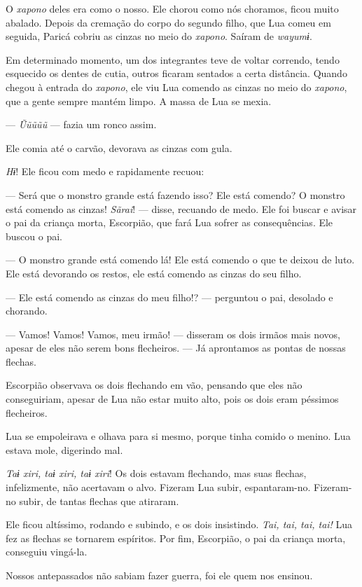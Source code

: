 O \textit{xapono} deles era como o nosso. Ele chorou como nós choramos, ficou
muito abalado. Depois da cremação do corpo do segundo filho, que Lua
comeu em seguida, Paricá cobriu as cinzas no meio do \textit{xapono}. Saíram
de \textit{wayumɨ}. 

Em determinado momento, um dos integrantes teve de voltar correndo,
tendo esquecido os dentes de cutia, outros ficaram sentados a certa
distância. Quando chegou à entrada do \textit{xapono}, ele viu Lua comendo as
cinzas no meio do \textit{xapono}, que a gente sempre mantém limpo. A massa de
Lua se mexia.

--- \textit{Ũũũũũ} --- fazia um ronco assim. 

Ele comia até o carvão, devorava as cinzas com gula. 

\textit{Hɨ}! Ele ficou com medo e rapidamente recuou: 

--- Será que o monstro grande está fazendo isso? Ele está comendo? O
monstro está comendo as cinzas! \textit{Sãrai}! --- disse, recuando de
medo. Ele foi buscar e avisar o pai da criança morta, Escorpião, que
fará Lua sofrer as consequências. Ele buscou o pai. 

--- O monstro grande está comendo lá! Ele está comendo o que te deixou de
luto. Ele está devorando os restos, ele está comendo as cinzas
do seu filho. 

--- Ele está comendo as cinzas do meu filho!? --- perguntou o pai, desolado e
chorando. 

--- Vamos! Vamos! Vamos, meu irmão! --- disseram os dois irmãos mais
novos, apesar de eles não serem bons flecheiros. --- Já aprontamos as pontas de nossas flechas. 

Escorpião observava os dois flechando em vão, pensando que eles não
conseguiriam, apesar de Lua não estar muito alto, pois os dois eram
péssimos flecheiros. 

Lua se empoleirava e olhava para si mesmo, porque tinha comido o
menino. Lua estava mole, digerindo mal. 

\textit{Taɨ xiri, taɨ xiri, taɨ xiri}! Os dois estavam flechando, mas suas
flechas, infelizmente, não acertavam o alvo. Fizeram Lua subir,
espantaram-no. Fizeram-no subir, de tantas flechas que atiraram. 

Ele ficou altíssimo, rodando e subindo, e os dois insistindo. \textit{Tai,
tai, tai, tai!} Lua fez as flechas se tornarem espíritos. Por fim,
Escorpião, o pai da criança morta, conseguiu vingá-la. 

Nossos antepassados não sabiam fazer guerra, foi ele quem nos ensinou. 

